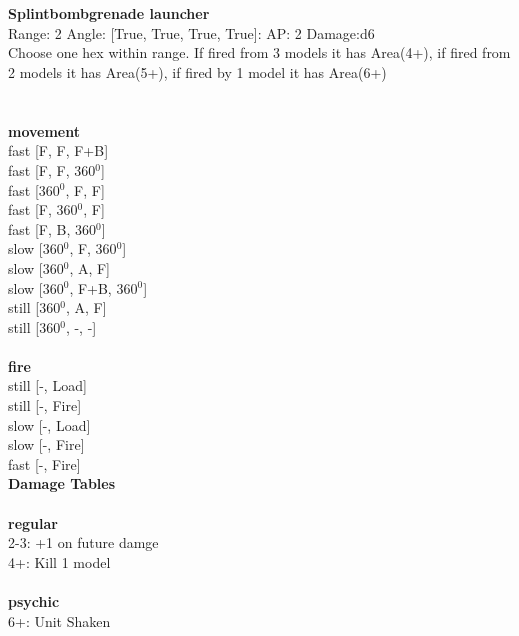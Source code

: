 \ \\

\ \\
{\bf Splintbombgrenade launcher } \\



Range: 2  Angle: [True, True, True, True]: AP: 2 Damage:d6 \\
Choose one hex within range. If fired from 3 models it has Area(4+), if fired from 2 models it has Area(5+), if fired by 1 model it has Area(6+)\\ 




 
\ \\



\ \\ {\bf movement } \\
fast [F, F, F+B] \\
fast [F, F, 360$^0$] \\
fast [360$^0$, F, F] \\
fast [F, 360$^0$, F] \\
fast [F, B, 360$^0$] \\
slow [360$^0$, F, 360$^0$] \\
slow [360$^0$, A, F] \\
slow [360$^0$, F+B, 360$^0$] \\
still [360$^0$, A, F] \\
still [360$^0$, -, -] \\
\ \\ {\bf fire } \\
still [-, Load] \\
still [-, Fire] \\
slow [-, Load] \\
slow [-, Fire] \\
fast [-, Fire] \\


{\bf Damage Tables} \\
\ \\ {\bf regular } \\
2-3: +1 on future damge \\
4+: Kill 1 model \\
\ \\ {\bf psychic } \\
6+: Unit Shaken \\










